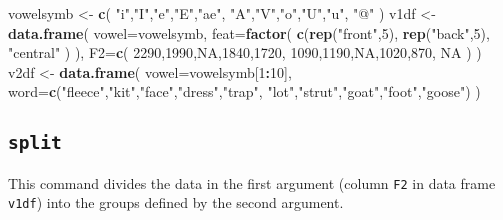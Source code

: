 \documentclass[]{book}
\newenvironment{Shaded}{\begin{snugshade}}{\end{snugshade}}
\newcommand{\DataTypeTok}[1]{\textcolor[rgb]{0.13,0.29,0.53}{#1}}
\newcommand{\DecValTok}[1]{\textcolor[rgb]{0.00,0.00,0.81}{#1}}
\newcommand{\KeywordTok}[1]{\textcolor[rgb]{0.13,0.29,0.53}{\textbf{#1}}}
\newcommand{\NormalTok}[1]{#1}
\newcommand{\OperatorTok}[1]{\textcolor[rgb]{0.81,0.36,0.00}{\textbf{#1}}}
\newcommand{\OtherTok}[1]{\textcolor[rgb]{0.56,0.35,0.01}{#1}}
\newcommand{\StringTok}[1]{\textcolor[rgb]{0.31,0.60,0.02}{#1}}
\begin{document}
\begin{Shaded}
\begin{Highlighting}[]
\NormalTok{vowelsymb <-}\StringTok{ }\KeywordTok{c}\NormalTok{( }\StringTok{"i"}\NormalTok{,}\StringTok{"I"}\NormalTok{,}\StringTok{"e"}\NormalTok{,}\StringTok{"E"}\NormalTok{,}\StringTok{"ae"}\NormalTok{, }\StringTok{"A"}\NormalTok{,}\StringTok{"V"}\NormalTok{,}\StringTok{"o"}\NormalTok{,}\StringTok{"U"}\NormalTok{,}\StringTok{"u"}\NormalTok{, }\StringTok{"@"}\NormalTok{ )}
\NormalTok{v1df <-}\StringTok{ }\KeywordTok{data.frame}\NormalTok{( }\DataTypeTok{vowel=}\NormalTok{vowelsymb,}
                    \DataTypeTok{feat=}\KeywordTok{factor}\NormalTok{( }\KeywordTok{c}\NormalTok{(}\KeywordTok{rep}\NormalTok{(}\StringTok{"front"}\NormalTok{,}\DecValTok{5}\NormalTok{),}
                                   \KeywordTok{rep}\NormalTok{(}\StringTok{"back"}\NormalTok{,}\DecValTok{5}\NormalTok{),}
                                   \StringTok{"central"}\NormalTok{ ) ),}
                    \DataTypeTok{F2=}\KeywordTok{c}\NormalTok{( }\DecValTok{2290}\NormalTok{,}\DecValTok{1990}\NormalTok{,}\OtherTok{NA}\NormalTok{,}\DecValTok{1840}\NormalTok{,}\DecValTok{1720}\NormalTok{, }
                          \DecValTok{1090}\NormalTok{,}\DecValTok{1190}\NormalTok{,}\OtherTok{NA}\NormalTok{,}\DecValTok{1020}\NormalTok{,}\DecValTok{870}\NormalTok{,}
                          \OtherTok{NA}\NormalTok{ ) )}
\NormalTok{v2df <-}\StringTok{ }\KeywordTok{data.frame}\NormalTok{( }\DataTypeTok{vowel=}\NormalTok{vowelsymb[}\DecValTok{1}\OperatorTok{:}\DecValTok{10}\NormalTok{], }
                    \DataTypeTok{word=}\KeywordTok{c}\NormalTok{(}\StringTok{"fleece"}\NormalTok{,}\StringTok{"kit"}\NormalTok{,}\StringTok{"face"}\NormalTok{,}\StringTok{"dress"}\NormalTok{,}\StringTok{"trap"}\NormalTok{, }
                           \StringTok{"lot"}\NormalTok{,}\StringTok{"strut"}\NormalTok{,}\StringTok{"goat"}\NormalTok{,}\StringTok{"foot"}\NormalTok{,}\StringTok{"goose"}\NormalTok{) )}
\end{Highlighting}
\end{Shaded}

\hypertarget{split}{%
\subsection{\texorpdfstring{\texttt{split}}{split}}\label{split}}

This command divides the data in the first argument (column \texttt{F2} in
data frame \texttt{v1df}) into the groups defined by the second argument.
\end{document}
